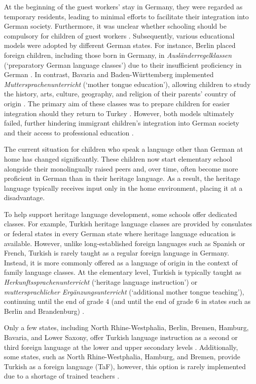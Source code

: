 At the beginning of the guest workers' stay in Germany, they were regarded as temporary residents, leading to minimal efforts to facilitate their integration into German society. Furthermore, it was unclear whether schooling should be compulsory for children of guest workers \citep{Beck1999}. Subsequently, various educational models were adopted by different German states. For instance, Berlin placed foreign children, including those born in Germany, in \textit{Ausländerregelklassen} (`preparatory German language classes') due to their insufficient proficiency in German \citep{Pfaff1991}. In contrast, Bavaria and Baden-Württemberg implemented \textit{Muttersprachenunterricht} (`mother tongue education'), allowing children to study the history, arts, culture, geography, and religion of their parents’ country of origin \citep{Damanakis1983}. The primary aim of these classes was to prepare children for easier integration should they return to Turkey \citep{Damanakis1983}. However, both models ultimately failed, further hindering immigrant children’s integration into German society and their access to professional education \citep{Beck1999}.

The current situation for children who speak a language other than German at home has changed significantly. These children now start elementary school alongside their monolingually raised peers and, over time, often become more proficient in German than in their heritage language. As a result, the heritage language typically receives input only in the home environment, placing it at a disadvantage.

To help support heritage language development, some schools offer dedicated classes. For example, Turkish heritage language classes are provided by consulates or federal states in every German state where heritage language education is available. However, unlike long-established foreign languages such as Spanish or French, Turkish is rarely taught as a regular foreign language in Germany. Instead, it is more commonly offered as a language of origin in the context of family language classes. At the elementary level, Turkish is typically taught as \textit{Herkunftssprachenunterricht} (`heritage language instruction') or \textit{muttersprachlicher Ergänzungsunterricht} (`additional mother tongue teaching'), continuing until the end of grade 4 (and until the end of grade 6 in states such as Berlin and Brandenburg) \citep{KuppersEtAl2014}.

Only a few states, including North Rhine-Westphalia, Berlin, Bremen, Hamburg, Bavaria, and Lower Saxony, offer Turkish language instruction as a second or third foreign language at the lower and upper secondary levels \citep{KuppersEtAl2014}. Additionally, some states, such as North Rhine-Westphalia, Hamburg, and Bremen, provide Turkish as a foreign language (TaF), however, this option is rarely implemented due to a shortage of trained teachers \citep{Schroeder2003}.


